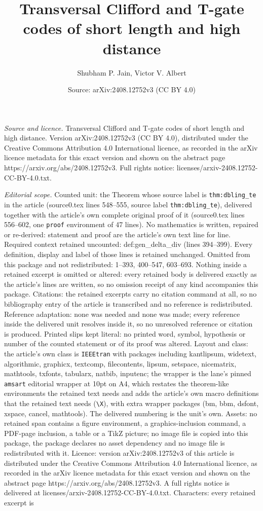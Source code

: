 \documentclass[10pt,a4paper]{amsart}
\title[Transversal Clifford and T-gate codes of short length and hi]{Transversal Clifford and T-gate codes of short length and high distance}
\author{Shubham P. Jain, Victor V. Albert}
\date{Source: arXiv:2408.12752v3 (CC BY 4.0)}
\begin{document}
\maketitle

\noindent\emph{Source and licence.} Transversal Clifford and T-gate codes of short length and high distance. Version arXiv:2408.12752v3 (CC BY 4.0), distributed under the Creative Commons Attribution 4.0 International licence, as recorded in the arXiv licence metadata for this exact version and shown on the abstract page https://arxiv.org/abs/2408.12752v3. Full rights notice: licenses/arxiv-2408.12752-CC-BY-4.0.txt.\par\smallskip

\noindent\textit{Editorial scope.} Counted unit: the Theorem whose source label is \texttt{thm:dbling\_te} in the article (source0.tex lines 548--555, source label \texttt{thm:dbling\_te}), delivered together with the article's own complete original proof of it (source0.tex lines 556--602, one \texttt{proof} environment of 47 lines). No mathematics is written, repaired or re-derived: statement and proof are the article's own text line for line. Required context retained uncounted: def:gen\_delta\_div (lines 394--399). Every definition, display and label of those lines is retained unchanged. Omitted from this package and not redistributed: 1--393, 400--547, 603--693. Nothing inside a retained excerpt is omitted or altered: every retained body is delivered exactly as the article's lines are written, so no omission receipt of any kind accompanies this package. Citations: the retained excerpts carry no citation command at all, so no bibliography entry of the article is transcribed and no reference is redistributed. Reference adaptation: none was needed and none was made; every reference inside the delivered unit resolves inside it, so no unresolved reference or citation is produced. Printed slips kept literal: no printed word, symbol, hypothesis or number of the counted statement or of its proof was altered. Layout and class: the article's own class is \texttt{IEEEtran} with packages including kantlipsum, widetext, algorithmic, graphicx, textcomp, filecontents, lipsum, setspace, nicematrix, mathtools, txfonts, tabularx, natbib, inputenc; the wrapper is the lane's pinned \texttt{amsart} editorial wrapper at 10pt on A4, which restates the theorem-like environments the retained text needs and adds the article's own macro definitions that the retained text needs (\texttt{\textbackslash X}), with extra wrapper packages (bm, bbm, dsfont, xspace, cancel, mathtools). The delivered numbering is the unit's own. Assets: no retained span contains a figure environment, a graphics-inclusion command, a PDF-page inclusion, a table or a TikZ picture; no image file is copied into this package, the package declares no asset dependency and no image file is redistributed with it. Licence: version arXiv:2408.12752v3 of this article is distributed under the Creative Commons Attribution 4.0 International licence, as recorded in the arXiv licence metadata for this exact version and shown on the abstract page https://arxiv.org/abs/2408.12752v3. A full rights notice is delivered at licenses/arxiv-2408.12752-CC-BY-4.0.txt. Characters: every retained excerpt is 
\end{document}
